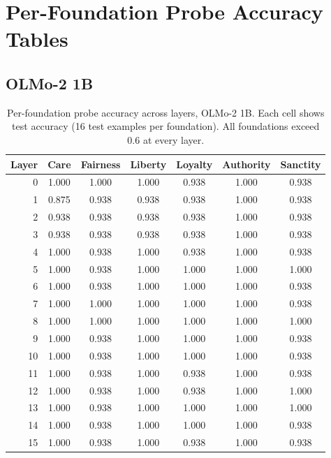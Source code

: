 \section{Per-Foundation Probe Accuracy Tables}\label{per-foundation-probe-accuracy-tables}

\label{app:accuracy}

\subsection{OLMo-2 1B}\label{a.1-olmo-2-1b}

\begin{table}[h]
\centering
\caption{Per-foundation probe accuracy across layers, OLMo-2 1B. Each cell shows test accuracy (16 test examples per foundation). All foundations exceed 0.6 at every layer.}
\label{tab:accuracy_olmo}
\small
\begin{tabular}{r cccccc}
\toprule
Layer & Care & Fairness & Liberty & Loyalty & Authority & Sanctity \\
\midrule
0  & 1.000 & 1.000 & 1.000 & 0.938 & 1.000 & 0.938 \\
1  & 0.875 & 0.938 & 0.938 & 0.938 & 1.000 & 0.938 \\
2  & 0.938 & 0.938 & 0.938 & 0.938 & 1.000 & 0.938 \\
3  & 0.938 & 0.938 & 0.938 & 0.938 & 1.000 & 0.938 \\
4  & 1.000 & 0.938 & 1.000 & 0.938 & 1.000 & 0.938 \\
5  & 1.000 & 0.938 & 1.000 & 1.000 & 1.000 & 1.000 \\
6  & 1.000 & 0.938 & 1.000 & 1.000 & 1.000 & 0.938 \\
7  & 1.000 & 1.000 & 1.000 & 1.000 & 1.000 & 0.938 \\
8  & 1.000 & 1.000 & 1.000 & 1.000 & 1.000 & 1.000 \\
9  & 1.000 & 0.938 & 1.000 & 1.000 & 1.000 & 0.938 \\
10 & 1.000 & 0.938 & 1.000 & 1.000 & 1.000 & 0.938 \\
11 & 1.000 & 0.938 & 1.000 & 0.938 & 1.000 & 0.938 \\
12 & 1.000 & 0.938 & 1.000 & 0.938 & 1.000 & 1.000 \\
13 & 1.000 & 0.938 & 1.000 & 1.000 & 1.000 & 1.000 \\
14 & 1.000 & 0.938 & 1.000 & 1.000 & 1.000 & 0.938 \\
15 & 1.000 & 0.938 & 1.000 & 0.938 & 1.000 & 0.938 \\
\bottomrule
\end{tabular}
\end{table}

